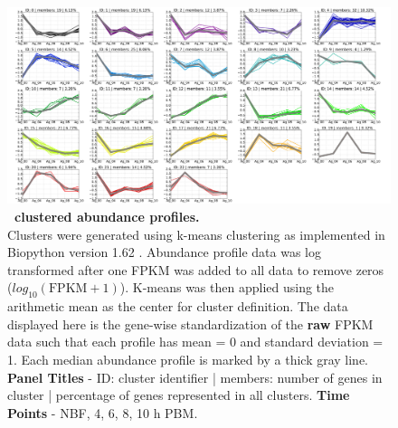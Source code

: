 
\begin{landscape}

    \begin{figure}[h]
    \centering
    \includegraphics[width=\linewidth]{figures/figs/ecr_and_insects_ptci_20130918_orthodb7/23clusters_ptci_0_95_orthodb7.pdf}
    \caption[\Ag\ clustered abundance profiles]{\sf \textbf{\Ag\ clustered abundance profiles.} \\ 
    Clusters were generated using k-means clustering as implemented in Biopython version 1.62 \cite{Cock2009}.  Abundance profile data was log transformed after one FPKM was added to all data to remove zeros ($log_{10}(\mathrm{FPKM}+1)$).  K-means was then applied using the arithmetic mean as the center for cluster definition.  The data displayed here is the gene-wise standardization of the \textbf{raw} FPKM data such that each profile has mean = 0 and standard deviation = 1. Each median abundance profile is marked by a thick gray line. \textbf{Panel Titles} - ID: cluster identifier | members: number of genes in cluster | percentage of genes represented in all clusters. \textbf{Time Points} - \gls{NBF}, 4, 6, 8, 10 h \gls{PBM}.
}
    \label{fig:23-clusters}
    \end{figure}
    
\end{landscape}


